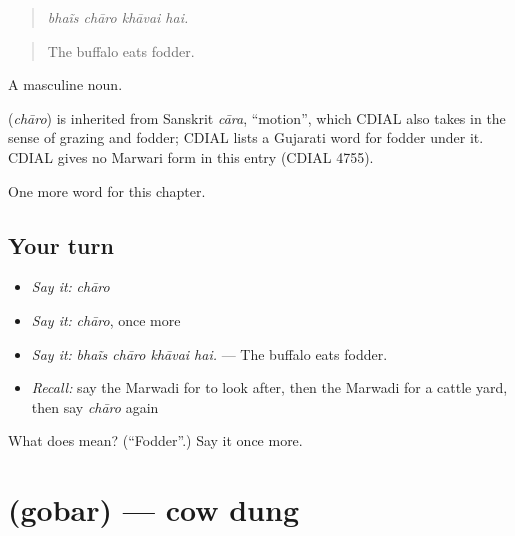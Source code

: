 \begin{quote}
   
\end{quote}

\begin{quote}
\emph{bhaĩs chāro khāvai hai.}
\end{quote}

\begin{quote}
The buffalo eats fodder.
\end{quote}

A masculine noun.

\begin{cousinweb}
\textbf{} (\emph{chāro}) is inherited from Sanskrit \emph{cāra}, \textquotedblleft{}motion\textquotedblright{}, which CDIAL also takes in the sense of grazing and fodder; CDIAL lists a Gujarati word for fodder under it. CDIAL gives no Marwari form in this entry (CDIAL 4755).
\end{cousinweb}

\begin{grammarlens}[title={What you've built}]
One more word for this chapter.
\end{grammarlens}

\subsection*{Your turn}
\begin{itemize}
\raggedright
  \item \emph{Say it:} \emph{chāro}
  \item \emph{Say it:} \emph{chāro}, once more
  \item \emph{Say it:} \emph{bhaĩs chāro khāvai hai.} — The buffalo eats fodder.
  \item \emph{Recall:} say the Marwadi for to look after, then the Marwadi for a cattle yard, then say \emph{chāro} again
\end{itemize}

\begin{tcolorbox}[breakable,colback=teal!4,colframe=teal!35!black,title={Before you move on}]
What does  mean? (\textquotedblleft{}Fodder\textquotedblright{}.) Say it once more.
\end{tcolorbox}
\section[\texorpdfstring{\mw{गोबर} (gobar)}{गोबर (gobar)}]{ (gobar) — cow dung}

